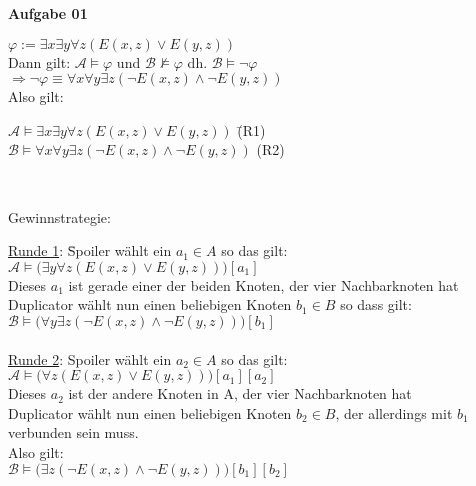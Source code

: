 \documentclass[a4paper,10pt]{article}
\begin{document}
	\parindent0pt
	\textbf{Aufgabe 01}
	\begin{compactenum} [(a)]
		\item $ \varphi := \exists x\exists y \forall z (E(x,z) \vee E(y,z))$\\
		Dann gilt: $ \mathcal{A} \models \varphi $ und $ \mathcal{B} \not\models \varphi$ dh. $ \mathcal{B} \models \lnot \varphi $\\
		$ \Longrightarrow \lnot \varphi \equiv \forall x \forall y \exists z (\lnot E(x,z) \wedge \lnot E(y,z)) $\\
		Also gilt:
		\begin{tabbing}
			$ \mathcal{A} \models \exists x\exists y \forall z (E(x,z) \vee E(y,z))$ \qquad \qquad \qquad \= (R1) \\
			$ \mathcal{B} \models \forall x \forall y \exists z (\lnot E(x,z) \wedge \lnot E(y,z)) $
			\> (R2)
		\end{tabbing} \
		
		Gewinnstrategie:\\
		\begin{tabbing}
			\underline{Runde 1}: \= Spoiler wählt ein $ a_1 \in A $ so das gilt:\\
			\> $ \mathcal{A} \models \big( \exists y \forall z (E(x,z) \vee E(y,z)) \big) [a_1] $\\
			\> Dieses $ a_1 $ ist gerade einer der beiden Knoten, der vier Nachbarknoten hat\\
			\> Duplicator wählt nun einen beliebigen Knoten $ b_1 \in B$ so dass gilt:\\
			\> $ \mathcal{B} \models \big(\forall y \exists z (\lnot E(x,z) \wedge \lnot E(y,z))\big) [b_1] $\\\\

			\underline{Runde 2}: Spoiler wählt ein $ a_2 \in A$ so das gilt:\\
			\> $\mathcal{A} \models \big(\forall z (E(x,z) \vee E(y,z))\big) [a_1][a_2]$\\
			\> Dieses $ a_2 $ ist der andere Knoten in A, der vier Nachbarknoten hat\\
			\> Duplicator wählt nun einen beliebigen Knoten $ b_2 \in B $, der allerdings mit $ b_1 $ verbunden sein muss.\\
			\> Also gilt:\\
			\> $ \mathcal{B} \models \big(\exists z (\lnot E(x,z) \wedge \lnot E(y,z))\big) [b_1][b_2] $\\\\
			

\end{tabbing}
\end{compactenum}
\end{document}
